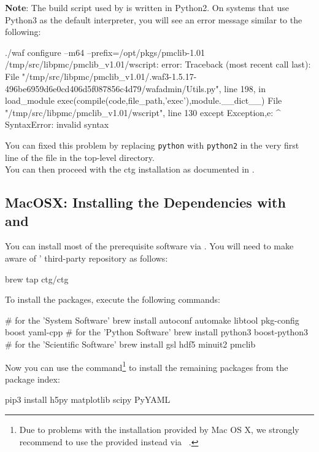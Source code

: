 \textbf{Note}: The  build script used by  is written in Python2. On
systems that use Python3 as the default interpreter, you will see an error message similar
to the following:
\begin{file}
./waf configure --m64 --prefix=/opt/pkgs/pmclib-1.01
/tmp/src/libpmc/pmclib_v1.01/wscript: error: Traceback (most recent call last):
  File "/tmp/src/libpmc/pmclib_v1.01/.waf3-1.5.17-496be6959d6e0cd406d5f087856c4d79/wafadmin/Utils.py", line 198, in load_module
    exec(compile(code,file_path,'exec'),module.__dict__)
  File "/tmp/src/libpmc/pmclib_v1.01/wscript", line 130
    except Exception,e:
                    ^
SyntaxError: invalid syntax
\end{file}
You can fixed this problem by replacing \texttt{python} with \texttt{python2} in the very first
line of the file  in the top-level  directory.\\

You can then proceed with the ctg installation as documented in .

\subsection{MacOSX: Installing the Dependencies with  and }

You can install most of the prerequisite software via .
You will need to make  aware of \ctg'
third-party repository as follows:
\begin{commandline}
brew tap ctg/ctg
\end{commandline}

To install the packages, execute the following commands:
\begin{commandline}
# for the 'System Software'
brew install autoconf automake libtool pkg-config boost yaml-cpp
# for the 'Python Software'
brew install python3 boost-python3
# for the 'Scientific Software'
brew install gsl hdf5 minuit2 pmclib
\end{commandline}

Now you can use the  command\footnote{%
    Due to problems with the  installation provided by Mac OS
    X, we strongly recommend to use the  provided
     instead via ~.
}
to install the remaining packages from the  package index:
\begin{commandline}
pip3 install h5py matplotlib scipy PyYAML
\end{commandline}


